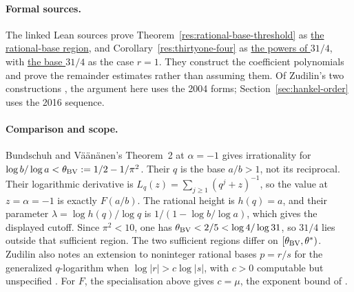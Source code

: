 \documentclass[11pt]{article}
\begin{document}
\paragraph{Formal sources.} The linked Lean sources prove Theorem~\ref{res:rational-base-threshold} as
\href{https://github.com/wcook04/plectis-erdos/blob/f4e61ed8a6941571310049e22dc239baa1b04e12/lean/ErdosProblems/Erdos1049/PaperR17/SourceConsumers.lean#L113}{the rational-base region},
and Corollary~\ref{res:thirtyone-four} as
\href{https://github.com/wcook04/plectis-erdos/blob/f4e61ed8a6941571310049e22dc239baa1b04e12/lean/ErdosProblems/Erdos1049/PaperR17/SourceConsumers.lean#L117}{the powers of $31/4$},
with
\href{https://github.com/wcook04/plectis-erdos/blob/f4e61ed8a6941571310049e22dc239baa1b04e12/lean/ErdosProblems/Erdos1049/PaperR17/SourceConsumers.lean#L121}{the base $31/4$}
as the case $r=1$. They construct the coefficient polynomials and prove
the remainder estimates rather than assuming them. Of Zudilin's two
constructions \cite{zudilin2004,zudilin2016}, the argument here uses
the 2004 forms; Section~\ref{sec:hankel-order} uses the 2016 sequence.

\paragraph{Comparison and scope.}
Bundschuh and V\"a\"an\"anen's Theorem~2 at $\alpha=-1$
\cite[p.~177]{bv1994} gives irrationality for
$\log b/\log a<\theta_{\rm BV}:=1/2-1/\pi^2$.
Their $q$ is the base $a/b>1$, not its reciprocal. Their logarithmic
derivative is $L_q(z)=\sum_{j\ge1}(q^j+z)^{-1}$, so the value at
$z=\alpha=-1$ is exactly $F(a/b)$. The rational height is $h(q)=a$,
and their parameter $\lambda=\log h(q)/\log q$ is
$1/(1-\log b/\log a)$, which gives the displayed cutoff.
Since $\pi^2<10$, one has $\theta_{\rm BV}<2/5<\log4/\log31$, so $31/4$ lies
outside that sufficient region.  The two sufficient regions differ on
$[\theta_{\rm BV},\theta^*)$.
Zudilin also notes an extension to noninteger rational bases $p=r/s$
for the generalized $q$-logarithm when $\log|r|>c\log|s|$, with $c>0$
computable but unspecified \cite[Sec.~2, p.~4]{zudilin2016}.
For $F$, the specialisation above gives $c=\mu$, the exponent bound
of \cite[p.~162]{zudilin2004}.
\end{document}
